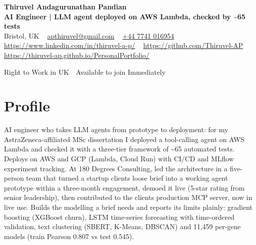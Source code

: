 \documentclass[a4paper,11pt]{article}
\newcommand{\num}[1]{\textbf{#1}}   %
\begin{document}
\begin{center}
  {\LARGE\bfseries Thiruvel Andagurunathan Pandian} \\[3pt]
  {\color{headernavy}\small\textbf{AI Engineer | LLM agent deployed on AWS Lambda, checked by \num{\textasciitilde{}65} tests}} \\[3pt]
  {\small
  Bristol, UK\nobreak\ \,\textbar\, \href{mailto:apthiruvel@gmail.com}{apthiruvel@gmail.com}\nobreak\ \,\textbar\, \href{tel:+447741016954}{+44 7741 016954}\nobreak\ \,\textbar\, \href{https://www.linkedin.com/in/thiruvel-a-p/}{https://www.linkedin.com/in/thiruvel-a-p/}\nobreak\ \,\textbar\, \href{https://github.com/Thiruvel-AP}{https://github.com/Thiruvel-AP}\nobreak\ \,\textbar\, \href{https://thiruvel-ap.github.io/PersonalPortfolio/}{https://thiruvel-ap.github.io/PersonalPortfolio/}}\par\vspace{4pt}
  \noindent{} Right to Work in UK \,\textbar\, Available to join Immediately
\end{center}

\section{Profile}
AI engineer who takes LLM agents from prototype to deployment: for my AstraZeneca-affiliated MSc dissertation I deployed a tool-calling agent on AWS Lambda and checked it with a three-tier framework of \textasciitilde{}65 automated tests. Deploys on AWS and GCP (Lambda, Cloud Run) with CI/CD and MLflow experiment tracking. At 180 Degrees Consulting, led the architecture in a five-person team that turned a startup client\textquotesingle{}s loose brief into a working agent prototype within a three-month engagement, demoed it live (5-star rating from senior leadership), then contributed to the client\textquotesingle{}s production MCP server, now in live use. Builds the modelling a brief needs and reports its limits plainly: gradient boosting (XGBoost churn), LSTM time-series forecasting with time-ordered validation, text clustering (SBERT, K-Means, DBSCAN) and 11,459 per-gene models (train Pearson 0.807 vs test 0.545).
\end{document}
